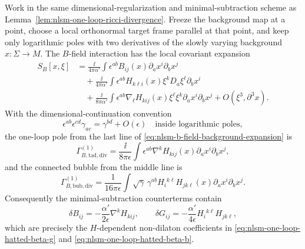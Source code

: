 \begin{lemma}
\label{lem:nlsm-one-loop-h-flux-poles}
Work in the same dimensional-regularization and minimal-subtraction scheme as
Lemma~\ref{lem:nlsm-one-loop-ricci-divergence}.  Freeze the background
map at a point, choose a local orthonormal target frame parallel at that point,
and keep only logarithmic poles with two derivatives of the slowly varying
background \(x:\Sigma\to M\).  The \(B\)-field interaction has the local
covariant expansion
\begin{equation}
\begin{aligned}
  S_B[x,\xi]
  &=
  \frac{\ii}{4\pi\alpha'}
  \int\epsilon^{ab}B_{ij}(x)\partial_ax^i\partial_bx^j
  \\
  &\quad+
  \frac{\ii}{4\pi\alpha'}
  \int\epsilon^{ab}
  H_{k\ell i}(x)\xi^kD_a\xi^\ell\partial_bx^i
  \\
  &\quad+
  \frac{\ii}{8\pi\alpha'}
  \int\epsilon^{ab}
  \nabla_\ell H_{kij}(x)\xi^\ell\xi^k
  \partial_ax^i\partial_bx^j
  +O(\xi^3,\partial^3x).
\end{aligned}
  \label{eq:nlsm-b-field-background-expansion}
\end{equation}
With the dimensional-continuation convention
\begin{equation}
  \epsilon^{ab}\epsilon^{cd}\gamma_{ac}
  =
  \gamma^{bd}+O(\epsilon)
  \quad\text{inside logarithmic poles},
  \label{eq:nlsm-epsilon-contraction-convention}
\end{equation}
the one-loop pole from the last line of
\eqref{eq:nlsm-b-field-background-expansion} is
\begin{equation}
  \Gamma^{(1)}_{B,\mathrm{tad},\mathrm{div}}
  =
  \frac{\ii}{8\pi\epsilon}
  \int
  \epsilon^{ab}\nabla^kH_{kij}(x)
  \partial_ax^i\partial_bx^j ,
  \label{eq:nlsm-b-tadpole-divergence}
\end{equation}
and the connected bubble from the middle line is
\begin{equation}
  \Gamma^{(1)}_{B,\mathrm{bub},\mathrm{div}}
  =
  \frac1{16\pi\epsilon}
  \int\sqrt\gamma\,\gamma^{ab}
  H_i{}^{k\ell}H_{jk\ell}(x)
  \partial_ax^i\partial_bx^j .
  \label{eq:nlsm-b-bubble-divergence}
\end{equation}
Consequently the minimal-subtraction counterterms contain
\begin{equation}
  \delta B_{ij}
  =
  -\frac{\alpha'}{2\epsilon}\nabla^kH_{kij},
  \qquad
  \delta G_{ij}
  =
  -\frac{\alpha'}{4\epsilon}H_i{}^{k\ell}H_{jk\ell},
  \label{eq:nlsm-h-flux-minimal-subtraction-counterterms}
\end{equation}
which are precisely the \(H\)-dependent non-dilaton coefficients in
\eqref{eq:nlsm-one-loop-hatted-beta-g} and
\eqref{eq:nlsm-one-loop-hatted-beta-b}.
\end{lemma}

